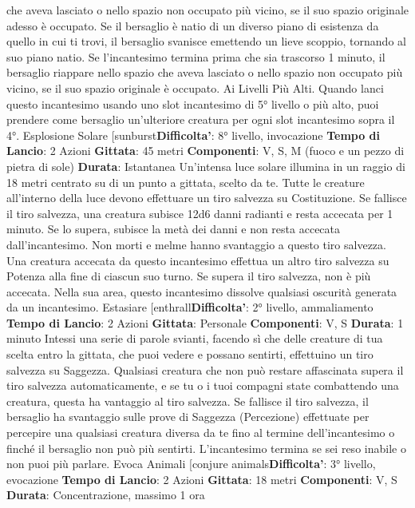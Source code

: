 \begin{multicols}{2}
che aveva lasciato o nello spazio non occupato più
vicino, se il suo spazio originale adesso è occupato.
Se il bersaglio è natio di un diverso piano di esistenza
da quello in cui ti trovi, il bersaglio svanisce emettendo
un lieve scoppio, tornando al suo piano natio. Se
l’incantesimo termina prima che sia trascorso 1 minuto,
il bersaglio riappare nello spazio che aveva lasciato o
nello spazio non occupato più vicino, se il suo spazio
originale è occupato.
Ai Livelli Più Alti. Quando lanci questo incantesimo
usando uno slot incantesimo di 5° livello o più alto, puoi
prendere come bersaglio un’ulteriore creatura per ogni
slot incantesimo sopra il 4°.
Esplosione Solare
[sunburst\textbf{Difficolta'}:
8° livello, invocazione
\textbf{Tempo di Lancio}: 2 Azioni
\textbf{Gittata}: 45 metri
\textbf{Componenti}: V, S, M (fuoco e un pezzo di pietra di
sole)
\textbf{Durata}: Istantanea
Un’intensa luce solare illumina in un raggio di 18 metri
centrato su di un punto a gittata, scelto da te. Tutte le
creature all’interno della luce devono effettuare un tiro
salvezza su Costituzione. Se fallisce il tiro salvezza,
una creatura subisce 12d6 danni radianti e resta
accecata per 1 minuto. Se lo supera, subisce la metà
dei danni e non resta accecata dall’incantesimo. Non
morti e melme hanno svantaggio a questo tiro salvezza.
Una creatura accecata da questo incantesimo effettua
un altro tiro salvezza su Potenza alla fine di ciascun
suo turno. Se supera il tiro salvezza, non è più
accecata.
Nella sua area, questo incantesimo dissolve qualsiasi
oscurità generata da un incantesimo.
Estasiare
[enthrall\textbf{Difficolta'}:
2° livello, ammaliamento
\textbf{Tempo di Lancio}: 2 Azioni
\textbf{Gittata}: Personale
\textbf{Componenti}: V, S
\textbf{Durata}: 1 minuto
Intessi una serie di parole svianti, facendo sì che delle
creature di tua scelta entro la gittata, che puoi vedere e
possano sentirti, effettuino un tiro salvezza su
Saggezza. Qualsiasi creatura che non può restare
affascinata supera il tiro salvezza automaticamente, e
se tu o i tuoi compagni state combattendo una creatura,
questa ha vantaggio al tiro salvezza. Se fallisce il tiro
salvezza, il bersaglio ha svantaggio sulle prove di
Saggezza (Percezione) effettuate per percepire una
qualsiasi creatura diversa da te fino al termine
dell’incantesimo o finché il bersaglio non può più
sentirti. L’incantesimo termina se sei reso inabile o non
puoi più parlare.
Evoca Animali
[conjure animals\textbf{Difficolta'}:
3° livello, evocazione
\textbf{Tempo di Lancio}: 2 Azioni
\textbf{Gittata}: 18 metri
\textbf{Componenti}: V, S
\textbf{Durata}: Concentrazione, massimo 1 ora

\end{multicols}

